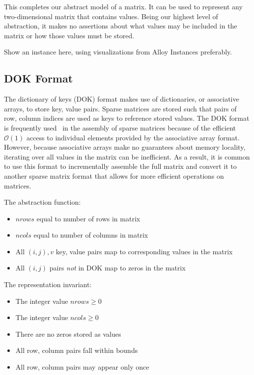 \documentclass[11pt,conference]{IEEEtran}
\begin{document}
This completes our abstract model of a matrix.  It can be used to represent any two-dimensional matrix that contains values.  Being our highest level of abstraction, it makes no assertions about what values may be included in the matrix or how those values must be stored.

Show an instance here, using visualizations from Alloy Instances preferably.

\subsection{DOK Format}

The dictionary of keys (DOK) format makes use of dictionaries, or associative arrays, to store key, value pairs.  Sparse matrices are stored such that pairs of row, column indices are used as keys to reference stored values.  The DOK format is frequently used~\cite{scipy, eigenweb2010} in the assembly of sparse matrices because of the efficient \(\mathcal{O}(1)\) access to individual elements provided by the associative array format.  However, because associative arrays make no guarantees about memory locality, iterating over all values in the matrix can be inefficient.  As a result, it is common to use this format to incrementally assemble the full matrix and convert it to another sparse matrix format that allows for more efficient operations on matrices.

The abstraction function:

\begin{itemize}
  \item \(nrows\) equal to number of rows in matrix
  \item \(ncols\) equal to number of columns in matrix
  \item All \((i, j), v\) key, value pairs map to corresponding values in the matrix
  \item All \((i, j)\) pairs \emph{not} in DOK map to zeros in the matrix
\end{itemize}

The representation invariant:

\begin{itemize}
  \item The integer value \(nrows \geq 0\)
  \item The integer value \(ncols \geq 0\)
  \item There are no zeros stored as values
  \item All row, column pairs fall within bounds
  \item All row, column pairs may appear only once
\end{itemize}
\end{document}
